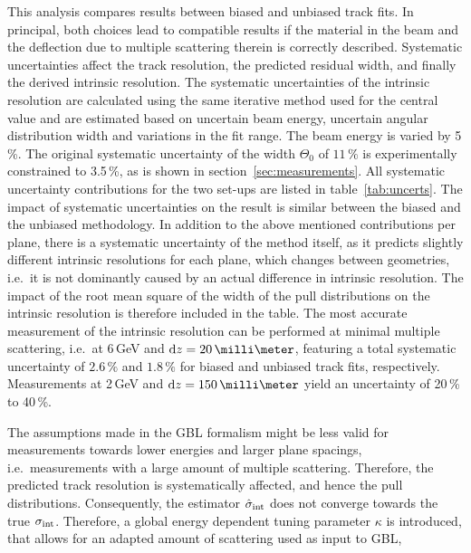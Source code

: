 This analysis compares results between biased and unbiased track fits. 
In principal, both choices lead to compatible results if the material in the beam and the deflection due to multiple scattering therein is correctly described. 
Systematic uncertainties affect the track resolution, the predicted residual width, and finally the derived intrinsic resolution. 
The systematic uncertainties of the intrinsic resolution are calculated using the same iterative method used for the central value and
 are estimated based on uncertain beam energy, uncertain angular distribution width and variations in the fit range. 
The beam energy is varied by 5\,\%. 
The original systematic uncertainty of the width $\Theta_{0}$ of $11\,\%$ is experimentally constrained to 3.5\,\%, as is shown in section~\ref{sec:measurements}. 
All systematic uncertainty contributions for the two set-ups are listed in table~\ref{tab:uncerts}. 
The impact of systematic uncertainties on the result is similar between the biased and the unbiased methodology. 
In addition to the above mentioned contributions per plane,
 there is a systematic uncertainty of the method itself, as it predicts slightly different intrinsic resolutions for each plane, which changes between geometries,
 i.e.\ it is not dominantly caused by an actual difference in intrinsic resolution. 
The impact of the root mean square of the width of the pull distributions on the intrinsic resolution is therefore included in the table. 
The most accurate measurement of the intrinsic resolution can be performed at minimal multiple scattering, i.e.\ at 6\,GeV and $\dz = 20\,\milli\meter$,
 featuring a total systematic uncertainty of $2.6\,\%$ and $1.8\,\%$ for biased and unbiased track fits, respectively. 
Measurements at 2\,GeV and $\dz = 150\,\milli\meter$ yield an uncertainty of 20\,\% to 40\,\%. 

The assumptions made in the GBL formalism might be less valid for measurements towards lower energies and larger plane spacings, i.e.\ measurements with a large amount of multiple scattering. 
Therefore, the predicted track resolution is systematically affected, and hence the pull distributions. 
Consequently, the estimator $\hat{\sigma}_{\textrm{int}}$ does not converge towards the true $\sigma_{\textrm{int}}$. 
Therefore, a global energy dependent tuning parameter $\kappa$ is introduced,
 that allows for an adapted amount of scattering used as input to GBL,

